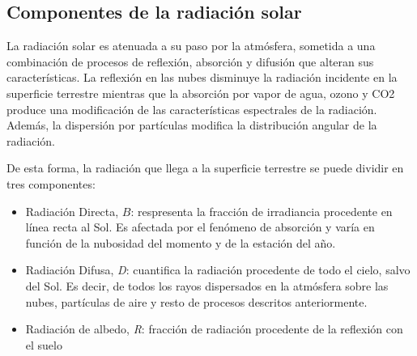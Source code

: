 %    
%
%

\subsection{Componentes de la radiación solar}
La radiación solar es atenuada a su paso por la atmósfera, sometida a una combinación de procesos de reflexión, absorción y difusión que alteran sus características. La reflexión en las nubes disminuye la radiación incidente en la superficie terrestre mientras que la absorción por vapor de agua, ozono y CO2 produce una modificación de las características espectrales de la radiación. Además, la dispersión por partículas modifica la distribución angular de la radiación. 

De esta forma, la radiación que llega a la superficie terrestre se puede dividir en tres componentes:

\begin{itemize}
    \item Radiación Directa, \textit{$B$}: respresenta la fracción de irradiancia procedente en línea recta al Sol. Es afectada por el fenómeno de absorción y varía en función de la nubosidad del momento y de la estación del año.
    \item Radiación Difusa, \textit{D}: cuantifica la radiación procedente de todo el cielo, salvo del Sol. Es decir, de todos los rayos dispersados en la atmósfera sobre las nubes, partículas de aire y resto de procesos descritos anteriormente.
    \item Radiación de albedo, \textit{R}: fracción de radiación procedente de la reflexión con el suelo
\end{itemize}

